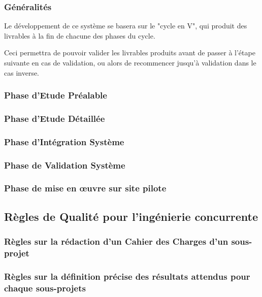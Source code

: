 \documentclass[a4paper]{article}
\begin{document}
\subsubsection{Généralités}

Le développement de ce système se basera sur le "cycle en V", qui produit des livrables à la fin de chacune des phases du cycle.

Ceci permettra de pouvoir valider les livrables produits avant de passer à l'étape suivante en cas de validation, ou alors de recommencer jusqu'à validation dans le cas inverse.


\subsubsection{Phase d'Etude Préalable}

\subsubsection{Phase d'Etude Détaillée}

\subsubsection{Phase d'Intégration Système}

\subsubsection{Phase de Validation Système}

\subsubsection{Phase de mise en œuvre sur site pilote}

\subsection{Règles de Qualité pour l'ingénierie concurrente}

\subsubsection{Règles sur la rédaction d'un Cahier des Charges d'un sous-projet}

\subsubsection{Règles sur la définition précise des résultats attendus pour chaque sous-projets}
\end{document}
